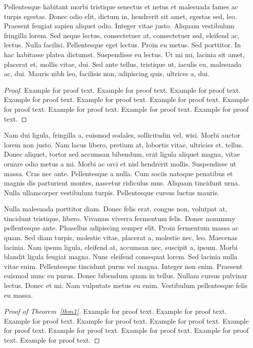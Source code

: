 \documentclass[ASNA,twocolumn]{USG} %
\begin{document}
{Pellentesque habitant morbi tristique senectus et netus et malesuada fames ac turpis egestas. Donec odio elit,
dictum in, hendrerit sit amet, egestas sed, leo. Praesent feugiat sapien aliquet odio. Integer vitae justo. Aliquam
vestibulum fringilla lorem. Sed neque lectus, consectetuer at, consectetuer sed, eleifend ac, lectus. Nulla facilisi.
Pellentesque eget lectus. Proin eu metus. Sed porttitor. In hac habitasse platea dictumst. Suspendisse eu lectus. Ut
mi mi, lacinia sit amet, placerat et, mollis vitae, dui. Sed ante tellus, tristique ut, iaculis eu, malesuada ac, dui.
Mauris nibh leo, facilisis non, adipiscing quis, ultrices a, dui.

\begin{proof}
Example for proof text. Example for proof text. Example for proof text. Example for proof text. Example for proof text. Example for proof text. Example for proof text. Example for proof text. Example for proof text. Example for proof text.
\end{proof}

Nam dui ligula, fringilla a, euismod sodales, sollicitudin vel, wisi. Morbi auctor lorem non justo. Nam lacus libero,
pretium at, lobortis vitae, ultricies et, tellus. Donec aliquet, tortor sed accumsan bibendum, erat ligula aliquet magna,
vitae ornare odio metus a mi. Morbi ac orci et nisl hendrerit mollis. Suspendisse ut massa. Cras nec ante. Pellentesque
a nulla. Cum sociis natoque penatibus et magnis dis parturient montes, nascetur ridiculus mus. Aliquam tincidunt
urna. Nulla ullamcorper vestibulum turpis. Pellentesque cursus luctus mauris.

Nulla malesuada porttitor diam. Donec felis erat, congue non, volutpat at, tincidunt tristique, libero. Vivamus
viverra fermentum felis. Donec nonummy pellentesque ante. Phasellus adipiscing semper elit. Proin fermentum massa
ac quam. Sed diam turpis, molestie vitae, placerat a, molestie nec, leo. Maecenas lacinia. Nam ipsum ligula, eleifend
at, accumsan nec, suscipit a, ipsum. Morbi blandit ligula feugiat magna. Nunc eleifend consequat lorem. Sed lacinia
nulla vitae enim. Pellentesque tincidunt purus vel magna. Integer non enim. Praesent euismod nunc eu purus. Donec
bibendum quam in tellus. Nullam cursus pulvinar lectus. Donec et mi. Nam vulputate metus eu enim. Vestibulum
pellentesque felis eu massa.

\begin{proof}[Proof of Theorem~{\rm\ref{thm1}}]
Example for proof text. Example for proof text. Example for proof text. Example for proof text. Example for proof text. Example for proof text. Example for proof text. Example for proof text. Example for proof text. Example for proof text.
\end{proof}



}
\end{document}
